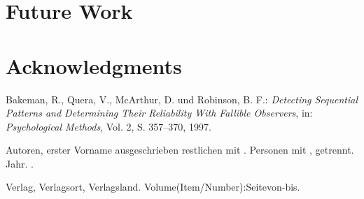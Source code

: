 \documentclass[11pt,a4paper]{article}
\begin{document}
\section{Future Work}
 \label{sec:Future Work}
 

\section*{Acknowledgments}
 
 
 
%
%

\begin{thebibliography}{}

Bakeman, R., Quera, V., McArthur, D. und Robinson, B. F.: {\em Detecting Sequential Patterns and Determining Their Reliability With Fallible Observers}, in: {\em Psychological Methods}, Vol. 2, S. 357--370, 1997. 



{Autoren, erster Vorname ausgeschrieben restlichen mit . Personen mit , getrennt}.
\newblock Jahr.
.

\newblock Verlag, Verlagsort, Verlagsland.
\newblock Volume(Item/Number):Seitevon-bis. 

\end{thebibliography}

\end{document}
